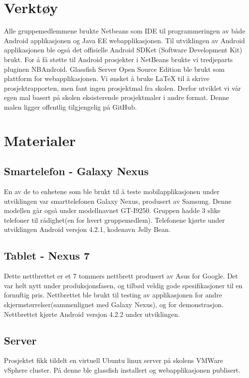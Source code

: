 \documentclass[../main.tex]{subfiles}
\begin{document}
\section{Verktøy}
Alle gruppemedlemmene brukte Netbeans som IDE til programmeringen av både Android applikasjonen og Java EE webapplikasjonen. Til utviklingen av Android applikasjonen ble også det offisielle Android SDKet (Software Development Kit) brukt. For å få støtte til Android prosjekter i NetBeans brukte vi tredjeparts pluginen NBAndroid. Glassfish Server Open Source Edition ble brukt som plattform for webapplikasjonen.\newline
\newline
Vi ønsket å bruke LaTeX til å skrive prosjektrapporten, men fant ingen prosjektmal fra skolen. Derfor utviklet vi vår egen mal basert på skolen eksisterende prosjektmaler i andre format. Denne malen ligger offentlig tilgjengelig på GitHub.

\section{Materialer}
\subsection{Smartelefon - Galaxy Nexus}
En av de to enhetene som ble brukt til å teste mobilapplikasjonen under utviklingen var smarttelefonen Galaxy Nexus, produsert av Samsung. Denne modellen går også under modellnavnet GT-I9250. Gruppen hadde 3 slike telefoner til rådighet(en for hvert gruppemedlem). Telefonene kjørte under utviklingen Android versjon 4.2.1, kodenavn Jelly Bean.
\subsection{Tablet - Nexus 7}
Dette nettbrettet er et 7 tommers nettbrett produsert av Asus for Google. Det var helt nytt under produksjonsfasen, og tilbød veldig gode spesifikasjoner til en fornuftig pris. Nettbrettet ble brukt til testing av applikasjonen for andre skjermstørrelser(sammenlignet med Galaxy Nexus), og for demonstrasjon. Nettbrettet kjørte Android versjon 4.2.2 under utviklingen.

\subsection{Server}
Prosjektet fikk tildelt en virtuell Ubuntu linux server på skolens VMWare vSphere cluster. På denne ble glassfish installert og webapplikasjonen publisert.
\end{document}
